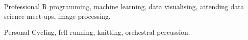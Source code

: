 
\begin{cvskills}
  \cvskill
    {Professional} %
    {R programming, machine learning, data visualising, attending data science meet-ups, image processing.} %

  \cvskill
    {Personal} %
    {Cycling, fell running, knitting, orchestral percussion.} %
\end{cvskills}
